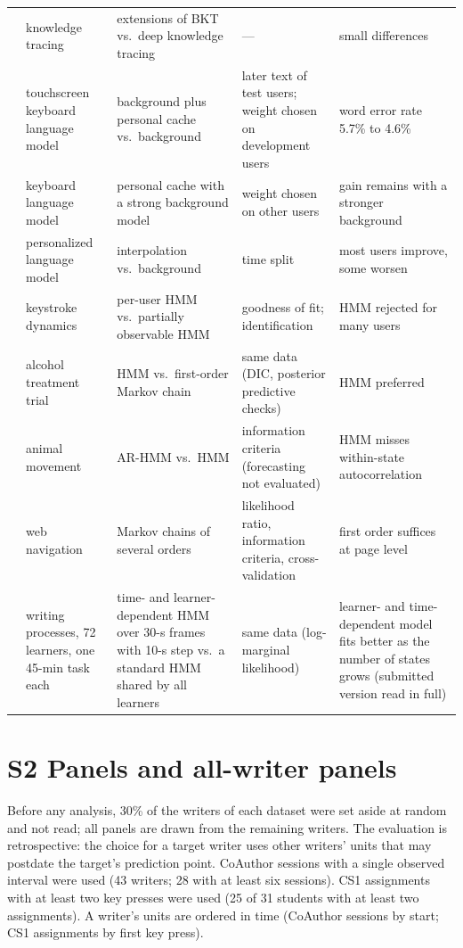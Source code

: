 \documentclass[10pt]{article}
\newcommand{\Ssec}[2]{\section*{S#1\texorpdfstring{\quad}{ } #2}\addcontentsline{toc}{section}{S#1\texorpdfstring{\quad}{ } #2}\label{S#1}}
\begin{document}
\begin{small}
\begin{longtable}{>{\raggedright}p{2.4cm}>{\raggedright}p{2.6cm}>{\raggedright}p{3.2cm}>{\raggedright}p{3.0cm}>{\raggedright\arraybackslash}p{3.6cm}}
\citet{Khajah2016} & knowledge tracing & extensions of BKT vs.\ deep knowledge tracing & --- & small differences \\
\citet{Fowler2015} & touchscreen keyboard language model & background plus personal cache vs.\ background & later text of test users; weight chosen on development users & word error rate 5.7\% to 4.6\% \\
\citet{Adhikary2023} & keyboard language model & personal cache with a strong background model & weight chosen on other users & gain remains with a stronger background \\
\citet{Shao2020} & personalized language model & interpolation vs.\ background & time split & most users improve, some worsen \\
\citet{Monaco2018} & keystroke dynamics & per-user HMM vs.\ partially observable HMM & goodness of fit; identification & HMM rejected for many users \\
\citet{Shirley2010} & alcohol treatment trial & HMM vs.\ first-order Markov chain & same data (DIC, posterior predictive checks) & HMM preferred \\
\citet{Stoye2025} & animal movement & AR-HMM vs.\ HMM & information criteria (forecasting not evaluated) & HMM misses within-state autocorrelation \\
\citet{Singer2014} & web navigation & Markov chains of several orders & likelihood ratio, information criteria, cross-validation & first order suffices at page level \\
\citet{Uto2020} & writing processes, 72 learners, one 45-min task each & time- and learner-dependent HMM over 30-s frames with 10-s step vs.\ a standard HMM shared by all learners & same data (log-marginal likelihood) & learner- and time-dependent model fits better as the number of states grows (submitted version read in full) \\
\bottomrule
\end{longtable}
\end{small}

\Ssec{2}{Panels and all-writer panels}

Before any analysis, 30\% of the writers of each dataset were set aside at random and not read; all panels are drawn from the remaining writers. The evaluation is retrospective: the choice for a target writer uses other writers' units that may postdate the target's prediction point. CoAuthor sessions with a single observed interval were used (43 writers; 28 with at least six sessions). CS1 assignments with at least two key presses were used (25 of 31 students with at least two assignments). A writer's units are ordered in time (CoAuthor sessions by start; CS1 assignments by first key press).
\end{document}
